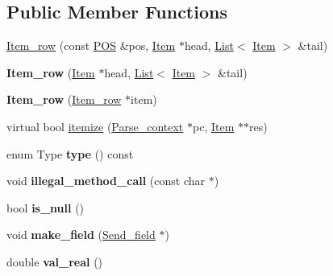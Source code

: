 \subsection*{Public Member Functions}
\begin{DoxyCompactItemize}
\item 
\mbox{\hyperlink{classItem__row_a8f0ccfbe35ebded8e8a9b3ba13ff9db3}{Item\+\_\+row}} (const \mbox{\hyperlink{structYYLTYPE}{P\+OS}} \&pos, \mbox{\hyperlink{classItem}{Item}} $\ast$head, \mbox{\hyperlink{classList}{List}}$<$ \mbox{\hyperlink{classItem}{Item}} $>$ \&tail)
\item 
\mbox{\label{classItem__row_a7f7782f117cbe1767549663d951ae94a}} 
{\bfseries Item\+\_\+row} (\mbox{\hyperlink{classItem}{Item}} $\ast$head, \mbox{\hyperlink{classList}{List}}$<$ \mbox{\hyperlink{classItem}{Item}} $>$ \&tail)
\item 
\mbox{\label{classItem__row_a68020803658e2ee8ec47b8266853bb11}} 
{\bfseries Item\+\_\+row} (\mbox{\hyperlink{classItem__row}{Item\+\_\+row}} $\ast$item)
\item 
virtual bool \mbox{\hyperlink{classItem__row_af0e050bb8e5b8942ac7d27da01ab897b}{itemize}} (\mbox{\hyperlink{structParse__context}{Parse\+\_\+context}} $\ast$pc, \mbox{\hyperlink{classItem}{Item}} $\ast$$\ast$res)
\item 
\mbox{\label{classItem__row_aec0eb1b46b1da34a19b7ca12ad62aff2}} 
enum Type {\bfseries type} () const
\item 
\mbox{\label{classItem__row_a049c3998fd5ea2854e842e4a8886a4af}} 
void {\bfseries illegal\+\_\+method\+\_\+call} (const char $\ast$)
\item 
\mbox{\label{classItem__row_ab233212fc0b75dac275524a1c8c04e4a}} 
bool {\bfseries is\+\_\+null} ()
\item 
\mbox{\label{classItem__row_abed64203c45211a339ef601a7b6b03e7}} 
void {\bfseries make\+\_\+field} (\mbox{\hyperlink{classSend__field}{Send\+\_\+field}} $\ast$)
\item 
\mbox{\label{classItem__row_a80e60b0d95fe5b6bf447695c0e0e9b82}} 
double {\bfseries val\+\_\+real} ()
\item 
$$
\end{DoxyCompactItemize}
